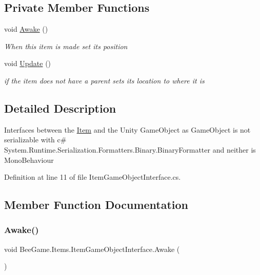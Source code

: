 \subsection*{Private Member Functions}
\begin{DoxyCompactItemize}
\item 
void \hyperlink{class_bee_game_1_1_items_1_1_item_game_object_interface_a1d99080fb7b3b79116ee4638dd4fc127}{Awake} ()
\begin{DoxyCompactList}\small\item\em When this item is made set its position \end{DoxyCompactList}\item 
void \hyperlink{class_bee_game_1_1_items_1_1_item_game_object_interface_a33075cc11237c1f56022d1c380679f27}{Update} ()
\begin{DoxyCompactList}\small\item\em if the item does not have a parent sets it\textquotesingle{}s location to where it is \end{DoxyCompactList}\end{DoxyCompactItemize}


\subsection{Detailed Description}
Interfaces between the \hyperlink{struct_bee_game_1_1_items_1_1_item}{Item} and the Unity Game\+Object as Game\+Object is not serializable with c\# System.\+Runtime.\+Serialization.\+Formatters.\+Binary.\+Binary\+Formatter and neither is Mono\+Behaviour 



Definition at line 11 of file Item\+Game\+Object\+Interface.\+cs.



\subsection{Member Function Documentation}
\mbox{\label{class_bee_game_1_1_items_1_1_item_game_object_interface_a1d99080fb7b3b79116ee4638dd4fc127}} 
\subsubsection{\texorpdfstring{Awake()}{Awake()}}
{\footnotesize\ttfamily void Bee\+Game.\+Items.\+Item\+Game\+Object\+Interface.\+Awake (\begin{DoxyParamCaption}{ }\end{DoxyParamCaption})\hspace{0.3cm}{\ttfamily [private]}}



